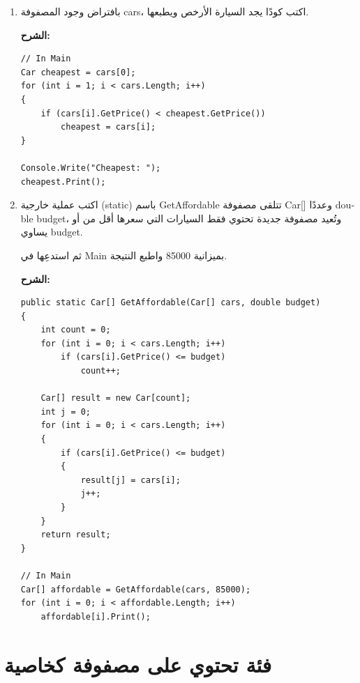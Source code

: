 \documentclass[14pt]{extarticle}
\begin{document}
\begin{enumerate}
\begin{english}
{\begin{verbatim}
Console.WriteLine("Total: " + total + " NIS");
\end{verbatim}
}
\end{english}
\clearpage
\fi

\item
بافتراض وجود المصفوفة \textenglish{cars}، اكتب كودًا يجد السيارة الأرخص ويطبعها.

\ifwithsols
\textbf{الشرح:}
\begin{english}
{\small
\begin{verbatim}
// In Main
Car cheapest = cars[0];
for (int i = 1; i < cars.Length; i++)
{
    if (cars[i].GetPrice() < cheapest.GetPrice())
        cheapest = cars[i];
}

Console.Write("Cheapest: ");
cheapest.Print();
\end{verbatim}
}
\end{english}
\clearpage
\fi

\item
اكتب عملية خارجية (\textenglish{static}) باسم \textenglish{GetAffordable}
تتلقى مصفوفة \textenglish{Car[]} وعددًا \textenglish{double budget}،
وتُعيد مصفوفة جديدة تحتوي فقط السيارات التي سعرها أقل من أو يساوي \textenglish{budget}.

ثم استدعِها في \textenglish{Main} بميزانية \textenglish{85000} واطبع النتيجة.

\ifwithsols
\textbf{الشرح:}
\begin{english}
{\small
\begin{verbatim}
public static Car[] GetAffordable(Car[] cars, double budget)
{
    int count = 0;
    for (int i = 0; i < cars.Length; i++)
        if (cars[i].GetPrice() <= budget)
            count++;

    Car[] result = new Car[count];
    int j = 0;
    for (int i = 0; i < cars.Length; i++)
    {
        if (cars[i].GetPrice() <= budget)
        {
            result[j] = cars[i];
            j++;
        }
    }
    return result;
}

// In Main
Car[] affordable = GetAffordable(cars, 85000);
for (int i = 0; i < affordable.Length; i++)
    affordable[i].Print();
\end{verbatim}
}
\end{english}
\fi

\end{enumerate}

\clearpage
\section{فئة تحتوي على مصفوفة كخاصية}
\end{document}

